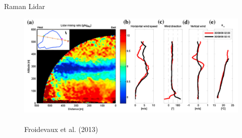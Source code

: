 \begin{frame}{Raman Lidar}
 \begin{figure}
      \includegraphics[width=\textwidth]{fig9.png}
      \centering \tiny~\\Froidevaux et al. (2013)
  \end{figure}
\end{frame}


